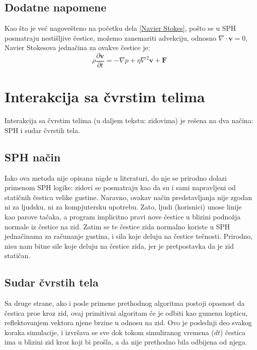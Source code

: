 \documentclass[12pt]{article}
\renewcommand{\vec}[1]{\mathbf{#1}}
\begin{document}
    \subsection{Dodatne napomene}
        Kao \v sto je ve\'c nagove\v steno na po\v cetku dela \ref{Navier Stokes}, po\v sto se u SPH posmatraju nesti\v sljive \v cestice, mo\v zemo zanemariti advekciju, odnosno $\nabla \cdot \vec{v}=0$, Navier Stokesova jedna\v cina za ovakve \v cestice je:
        \begin{equation}\label{eq:Navier-Stokes pojednostavljeni}
        \rho \frac{\partial \vec{v}}{\partial t} = -\nabla p +\eta \nabla^2\vec{v}+\vec{F}
        \end{equation}
\section{Interakcija sa \v cvrstim telima}
    Interakcija sa \v cvrstim telima (u daljem tekstu: zidovima) je re\v sena na dva na\v cina: SPH i sudar \v cvrstih tela.
    \subsection{SPH na\v cin}\label{SPH sudari sa zidom}
        Iako ova metoda nije opisana nigde u literaturi, do nje se prirodno dolazi primenom SPH logike: zidovi se posmatraju kao da su i sami napravljeni od stati\v cnih \v cestica velike gustine. Naravno, ovakav na\v cin predstavljanja nije zgodan ni za ljudsku, ni za kompjutersku upotrebu. Zato, ljudi (korisnici) unose linije kao parove ta\v caka, a program implicitno pravi nove \v cestice u blizini podno\v zja normale iz \v cestice na zid. Zatim se te \v cestice zida normalno koriste u SPH jedna\v cinama za ra\v cunanje gustina, i sila koje deluju na \v cestice te\v cnosti. Prirodno, nisu nam bitne sile koje deluju na \v cestice zida, jer je pretpostavka da je zid stati\v can.
    \subsection{Sudar \v cvrstih tela} \label{Sudar cvrstih tela}
        Sa druge strane, ako i posle primene prethodnog algoritma postoji opasnost da \v cestica pro\dj e kroz zid, ovaj primitivni algoritam \'ce je odbiti kao gumenu lopticu, reflektovanjem vektora njene brzine u odnosu na zid. Ovo je poslednji deo svakog koraka simulacije, i izvr\v sava se sve dok tokom simuliranog vremena ($dt$) \v cestica ima u blizini zid kroz koji bi pro\v sla, a da nije prethodno bila odbijena od njega.
\end{document}
